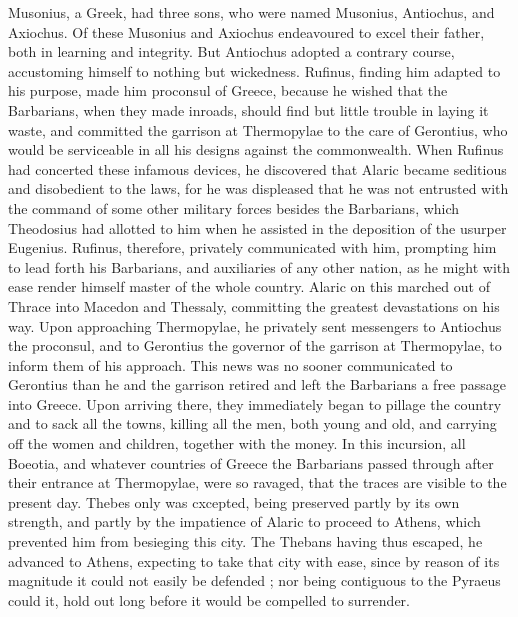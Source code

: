 Musonius, a Greek, had three sons, who were named Musonius, Antiochus, and Axiochus. Of these Musonius and Axiochus endeavoured to excel their father, both in learning and integrity. But Antiochus adopted a contrary course, accustoming himself to nothing but wickedness. Rufinus, finding him adapted to his purpose, made him proconsul of Greece, because he wished that the Barbarians, when they made inroads, should find but little trouble in laying it waste, and committed the garrison at Thermopylae to the care of Gerontius, who would be serviceable in all his designs against the commonwealth. When Rufinus had concerted these infamous devices, he discovered that Alaric became seditious and disobedient to the laws, for he was displeased that he was not entrusted with the command of some other military forces besides the Barbarians, which Theodosius had allotted to him when he assisted in the deposition of the usurper Eugenius. Rufinus, therefore, privately communicated with him, prompting him to lead forth his Barbarians, and auxiliaries of any other nation, as he might with ease render himself master of the whole country. Alaric on this marched out of Thrace into Macedon and Thessaly, committing the greatest devastations on his way. Upon approaching Thermopylae, he privately sent messengers to Antiochus the proconsul, and to Gerontius the governor of the garrison at Thermopylae, to inform them of his approach. This news was no sooner communicated to Gerontius than he and the garrison retired and left the Barbarians a free passage into Greece. Upon arriving there, they immediately began to pillage the country and to sack all the towns, killing all the men, both young and old, and carrying off the women and children, together with the money. In this incursion, all Boeotia, and whatever countries of Greece the Barbarians passed through after their entrance at Thermopylae, were so ravaged, that the traces are visible to the present day. Thebes only was cxcepted, being preserved partly by its own strength, and partly by the impatience of Alaric to proceed to Athens, which prevented him from besieging this city. The Thebans having thus escaped, he advanced to Athens, expecting to take that city with ease, since by reason of its magnitude it could not easily be defended ; nor being contiguous to the Pyraeus could it, hold out long before it would be compelled to surrender.

